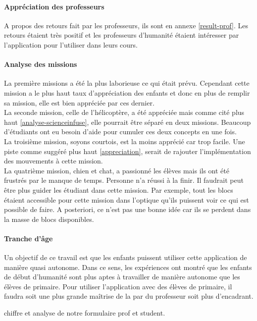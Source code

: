 \paragraph{Appréciation des professeurs}
A propos des retours fait par les professeurs, ils sont en annexe \ref{result-prof}. Les retours étaient très positif et les professeurs d'humanité étaient intéresser par l'application pour l'utiliser dans leurs cours.

\paragraph{Analyse des missions}
La première missions a été la plus laborieuse ce qui était prévu. Cependant cette mission a le plus haut taux d'appréciation des enfants et donc en plus de remplir sa mission, elle est bien appréciée par ces dernier.\\

La seconde mission, celle de l'hélicoptère, a été appréciée mais comme cité plus haut \ref{analyse-scienceinfuse}, elle pourrait être séparé en deux missions. Beaucoup d'étudiants ont eu besoin d'aide pour cumuler ces deux concepts en une fois.\\

La troisième mission, soyons courtois, est la moins apprécié car trop facile. Une piste comme suggéré plus haut \ref{appreciation}, serait de rajouter l'implémentation des mouvements à cette mission.\\

La quatrième mission, chien et chat, a passionné les élèves mais ils ont été frustrés par le manque de temps. Personne n'a réussi à la finir. Il faudrait peut être plus guider les étudiant dans cette mission. Par exemple, tout les blocs étaient accessible pour cette mission dans l'optique qu'ils puissent voir ce qui est possible de faire. A posteriori, ce n'est pas une bonne idée car ils se perdent dans la masse de blocs disponibles.

\paragraph{Tranche d'âge}
Un objectif de ce travail est que les enfants puissent utiliser cette application de manière quasi autonome. Dans ce sens, les expériences ont montré que les enfants de début d'humanité sont plus aptes à travailler de manière autonome que les élèves de primaire.
Pour utiliser l'application avec des élèves de primaire, il faudra soit une plus grande maîtrise de la par du professeur soit plus d'encadrant.






chiffre et analyse de notre formulaire prof et student.













